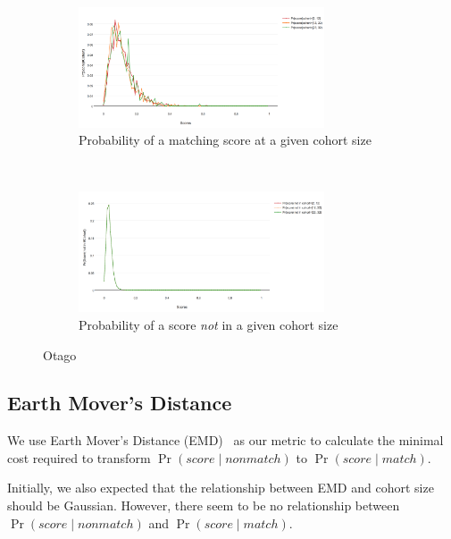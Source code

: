 \begin{figure}[htbp]
    \centering
    \begin{subfigure}[t]{\textwidth}
        \centering
        \includegraphics[width=0.8\textwidth]{dataset/otago/pscohort}
        \caption{Probability of a matching score at a given cohort size}
        \label{fig:otago_pscohort} %
    \end{subfigure}%
    \\
    \begin{subfigure}[t]{\textwidth}
        \centering
        \includegraphics[width=0.8\textwidth]{dataset/otago/psnoncohort}
        \caption{Probability of a score \emph{not} in a given cohort size}
        \label{fig:otago_psnoncohort} %
    \end{subfigure}%
    \caption{Otago}
    \label{fig:otago_psc} %
\end{figure}

\FloatBarrier%
\subsection{Earth Mover's Distance}

We use Earth Mover's Distance (EMD)~\cite{emd00} as our metric to calculate the
minimal cost required to transform $\Pr{(score \mid nonmatch)}$ to $\Pr{(score \mid match)}$.


Initially, we also expected that the relationship between EMD and cohort size
should be Gaussian. However, there seem to be no relationship between
$\Pr{(score \mid nonmatch)}$ and $\Pr{(score \mid match)}$.


